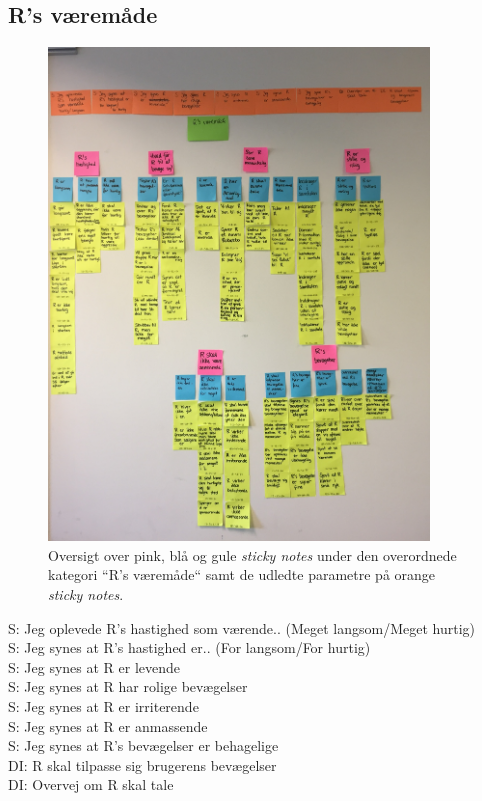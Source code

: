 \subsection{R's væremåde}
%
\begin{figure}[H]
\centering
\includegraphics[width = 0.9\textwidth]{Figure/AffinityDiagram/RsVaeremaade} 
\caption{Oversigt over pink, blå og gule \textit{sticky notes} under den overordnede kategori ``R's væremåde`` samt de udledte parametre på orange \textit{sticky notes}.}
\label{fig:AFRsVaeremaade}
\end{figure}
\noindent
%
S: Jeg oplevede R's hastighed som værende.. (Meget langsom/Meget hurtig)\\
S: Jeg synes at R's hastighed er.. (For langsom/For hurtig)\\
S: Jeg synes at R er levende\\
S: Jeg synes at R har rolige bevægelser\\
S: Jeg synes at R er irriterende\\
S: Jeg synes at R er anmassende\\
S: Jeg synes at R's bevægelser er behagelige\\
DI: R skal tilpasse sig brugerens bevægelser\\
DI: Overvej om R skal tale

